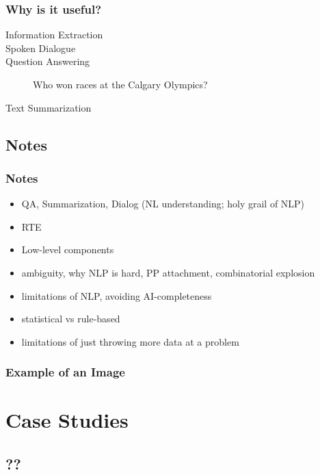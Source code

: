 \documentclass{beamer}             %
\begin{document}
\begin{frame}
  \frametitle{Why is it useful?}

  \begin{description}
    \item[Information Extraction] 
    \item[Spoken Dialogue] 
    \item[Question Answering] Who won races at the Calgary Olympics?
    \item[Text Summarization] 
  \end{description}



\end{frame}

\subsection{Notes}

\begin{frame}
  \frametitle{Notes}
  \begin{itemize}
    \item QA, Summarization, Dialog (NL understanding; holy grail of NLP)
    \item RTE
    \item Low-level components
    \item ambiguity, why NLP is hard, PP attachment, combinatorial explosion
    \item limitations of NLP, avoiding AI-completeness
    \item statistical vs rule-based
    \item limitations of just throwing more data at a problem
  \end{itemize}
\end{frame}

\begin{frame}
  \frametitle{Example of an Image}
\end{frame}


\section{Case Studies}

\subsection{??}
\end{document}
